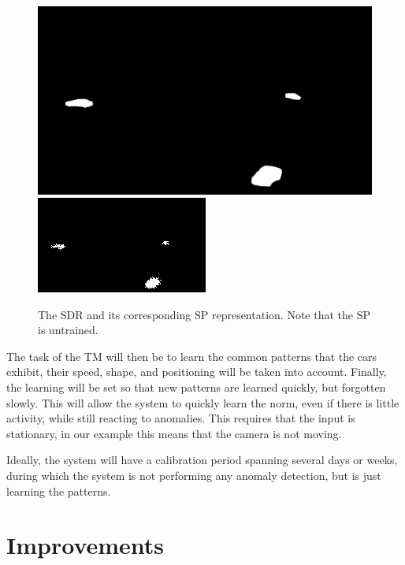 \begin{figure}[H]
    \centering
    \includegraphics[width=.48\textwidth]{resources/methodology/car_segmentation.png}
    \includegraphics[width=.48\textwidth]{resources/methodology/car_segmentation_sp.png}
    \caption{The SDR and its corresponding SP representation. Note that the SP is untrained.}
\end{figure}
\par
The task of the TM will then be to learn the common patterns that the cars exhibit, their speed, shape, and positioning will be taken into account. Finally, the learning will be set so that new patterns are learned quickly, but forgotten slowly. This will allow the system to quickly learn the norm, even if there is little activity, while still reacting to anomalies. This requires that the input is stationary, in our example this means that the camera is not moving.
\par
Ideally, the system will have a calibration period spanning several days or weeks, during which the system is not performing any anomaly detection, but is just learning the patterns.\par
\section{Improvements}
